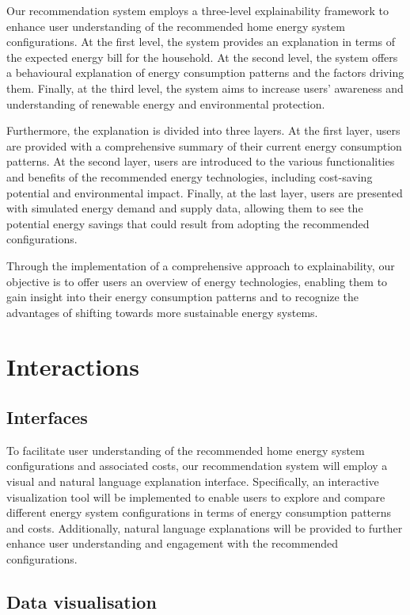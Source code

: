 Our recommendation system employs a three-level explainability framework to enhance user understanding of the recommended home energy system configurations. 
At the first level, the system provides an explanation in terms of the expected energy bill for the household. 
At the second level, the system offers a behavioural explanation of energy consumption patterns and the factors driving them. 
Finally, at the third level, the system aims to increase users' awareness and understanding of renewable energy and environmental protection.

Furthermore, the explanation is divided into three layers. 
At the first layer, users are provided with a comprehensive summary of their current energy consumption patterns. 
At the second layer, users are introduced to the various functionalities and benefits of the recommended energy technologies, including cost-saving potential and environmental impact. 
Finally, at the last layer, users are presented with simulated energy demand and supply data, allowing them to see the potential energy savings that could result from adopting the recommended configurations. 

Through the implementation of a comprehensive approach to explainability, our objective is to offer users an overview of energy technologies, enabling them to gain insight into their energy consumption patterns and to recognize the advantages of shifting towards more sustainable energy systems.

\section{Interactions}

\subsection{Interfaces}

To facilitate user understanding of the recommended home energy system configurations and associated costs, our recommendation system will employ a visual and natural language explanation interface. 
Specifically, an interactive visualization tool will be implemented to enable users to explore and compare different energy system configurations in terms of energy consumption patterns and costs. 
Additionally, natural language explanations will be provided to further enhance user understanding and engagement with the recommended configurations. 


\subsection{Data visualisation}


